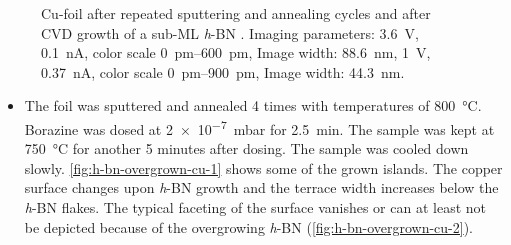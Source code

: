 \begin{figure}[] \centering
	 \quad
	\caption{Cu-foil after repeated sputtering and annealing cycles  and after CVD growth of a sub-ML \textit{h}-BN . Imaging parameters:  \SI{3.6}{\volt}, \SI{0.1}{\nano\ampere}, color scale \SIrange{0}{600}{\pico\meter}, Image width: \SI{88,6}{\nano \meter}, 
	 \SI{1}{\volt}, \SI{0.37}{\nano\ampere}, color scale \SIrange{0}{900}{\pico\meter}, Image width: \SI{44,3}{\nano \meter}.
	}
\end{figure}
\begin{itemize}
 \item The foil was sputtered and annealed 4 times with temperatures of \SI{800}{\celsius}. Borazine was dosed at \SI{2e-7}{\milli \bar} for \SI{2.5}{\minute}. The sample was kept at \SI{750}{\celsius} for another 5 minutes after dosing. The sample was cooled down slowly. \autoref{fig:h-bn-overgrown-cu-1} shows some of the grown islands. The copper surface changes upon \textit{h}-BN growth and the terrace width increases below the \textit{h}-BN flakes. The typical faceting of the surface vanishes or can at least not be depicted because of the overgrowing \textit{h}-BN (\autoref{fig:h-bn-overgrown-cu-2}). 
\end{itemize}
